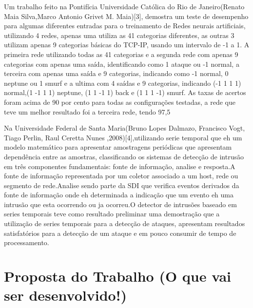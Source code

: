 \documentclass[
	12pt,				%
	openright,			%
	oneside,
	a4paper,			%
	english,			%
	french,				%
	spanish,			%
	brazil				%
	]{abntex2}
\begin{document}
Um trabalho feito na Pontifícia Universidade Católica do Rio de Janeiro(Renato Maia Silva,Marco Antonio Grivet M. Maia)[3], demostra um teste de desempenho para algumas diferentes entradas para o treinamento de Redes neurais artificiais,
utilizando 4 redes, apenas uma utiliza as 41 categorias diferentes, as outras 3 utilizam apenas 9 categorias básicas do TCP-IP, usando um intervalo de -1 a 1. A primeira rede utilizando todas as 41 categorias e a segunda rede com apenas 9 categorias com apenas uma saída, identificando como 1 ataque ou -1 normal, a terceira com apenas uma saída e 9 categorias, indicando como -1 normal, 0 neptune ou 1 smurf e a ultima com 4 saídas e 9 categorias, indicando (-1 1 1 1) normal,(1 -1 1 1) neptune, (1 1 -1 1) back e (1 1 1 -1) smurf. As taxas de acertos foram acima de 90 por cento para todas as configurações testadas, a rede que teve um melhor resultado foi a terceira rede, tendo 97,5%

Na Universidade Federal de Santa Maria(Bruno Lopes Dalmazo, Francisco Vogt, Tiago Perlin, Raul Ceretta Nunes ,2008)[4],utilizando serie temporal que eh um modelo matemático para apresentar amostragens periódicas que apresentam dependência entre as amostras, classificando os sistemas de detecção de intrusão em três componentes fundamentais: fonte de informação, analise e resposta.A fonte de informação representada por um coletor associado a um host, rede ou segmento de rede.Analise sendo parte da SDI que verifica eventos derivados da fonte de informação onde eh determinada a indicação que um evento eh uma intrusão que esta ocorrendo ou ja ocorreu.O detector de intrusões baseado em series temporais teve como resultado preliminar uma demostração que a utilização de series temporais para a detecção de ataques, apresentam resultados satisfatórios para a detecção de um ataque e em pouco consumir de tempo de processamento.


\chapter[Proposta do Trabalho]{Proposta do Trabalho (O que vai ser desenvolvido!)}


\end{document}
